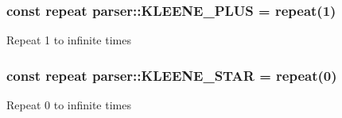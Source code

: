 \subsubsection[{\texorpdfstring{K\+L\+E\+E\+N\+E\+\_\+\+P\+L\+US}{KLEENE_PLUS}}]{\setlength{\rightskip}{0pt plus 5cm}const {\bf repeat} parser\+::\+K\+L\+E\+E\+N\+E\+\_\+\+P\+L\+US = {\bf repeat}(1)}\hypertarget{namespaceparser_a97ed17cb3337d680cb84ca3f2af8c2dd}{}\label{namespaceparser_a97ed17cb3337d680cb84ca3f2af8c2dd}
Repeat 1 to infinite times 
\subsubsection[{\texorpdfstring{K\+L\+E\+E\+N\+E\+\_\+\+S\+T\+AR}{KLEENE_STAR}}]{\setlength{\rightskip}{0pt plus 5cm}const {\bf repeat} parser\+::\+K\+L\+E\+E\+N\+E\+\_\+\+S\+T\+AR = {\bf repeat}(0)}\hypertarget{namespaceparser_ac46e69b1e6ac0db5fa1b987e69e0c64e}{}\label{namespaceparser_ac46e69b1e6ac0db5fa1b987e69e0c64e}
Repeat 0 to infinite times 